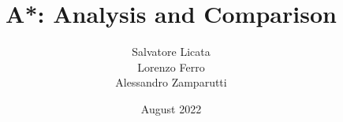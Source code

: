 \documentclass{article}
\begin{document}
\title{A*: Analysis and Comparison}


\author{
    Salvatore Licata \\
    Lorenzo Ferro \\
    Alessandro Zamparutti
    }
    
    \date{
    August 2022
    }
    
    \maketitle
    
    \tableofcontents
    
    



\newpage

\newpage

\newpage


\newpage

\nocite{*}
\printbibliography
\end{document}
